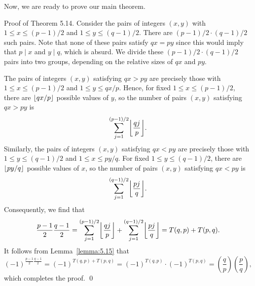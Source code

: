 Now, we are ready to prove our main theorem. 

{\sc Proof of Theorem 5.14.} Consider the pairs of integers $(x, y)$ with 
$1 \leq x \leq (p-1)/2$ and $1 \leq y \leq (q-1)/2$. There are 
$(p-1)/2 \cdot (q-1)/2$ such pairs. Note that none of these pairs satisfy 
$qx = py$ since this would imply that $p \mid x$ and $y \mid q$, which is absurd. 
We divide these $(p-1)/2 \cdot (q-1)/2$ pairs into two groups, depending 
on the relative sizes of $qx$ and $py$. 

The pairs of integers $(x, y)$ satisfying $qx > py$ are precisely those 
with $1 \leq x \leq (p-1)/2$ and $1 \leq y \leq qx/p$. Hence, for fixed 
$1 \leq x \leq (p-1)/2$, there are $\lfloor qx/p\rfloor$ possible values of $y$, so 
the number of pairs $(x, y)$ satisfying $qx > py$ is 
\[ \sum_{j=1}^{(p-1)/2} \floor*{\frac{qj}{p}}. \] 
Similarly, the pairs of integers $(x, y)$ satisfying $qx < py$ are precisely 
those with $1 \leq y \leq (q-1)/2$ and $1 \leq x \leq py/q$. For fixed 
$1 \leq y \leq (q-1)/2$, there are $\lfloor py/q\rfloor$ possible values of $x$, 
so the number of pairs $(x, y)$ satisfying $qx < py$ is 
\[ \sum_{j=1}^{(q-1)/2} \floor*{\frac{pj}{q}}. \] 
Consequently, we find that 
\[ \frac{p-1}2 \frac{q-1}2 = \sum_{j=1}^{(p-1)/2} \floor*{\frac{qj}{p}} 
+ \sum_{j=1}^{(q-1)/2} \floor*{\frac{pj}{q}} = T(q, p) + T(p, q). \] 
It follows from Lemma~\ref{lemma:5.15} that 
\[ (-1)^{\frac{p-1}2 \frac{q-1}2} = (-1)^{T(q, p) + T(p, q)} = 
(-1)^{T(q, p)} \cdot (-1)^{T(p, q)} = \left( \frac qp \right) \left( \frac pq 
\right), \] 
which completes the proof. \qed 